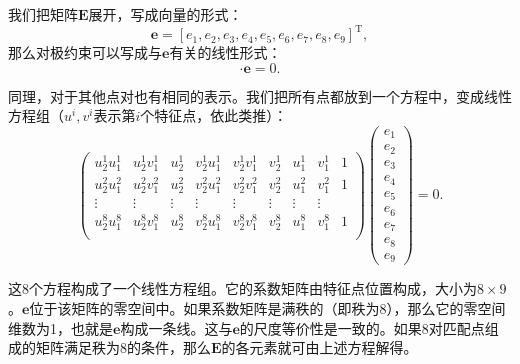 我们把矩阵$\bm{E}$展开，写成向量的形式：
\[
\bm{e}= [e_{1},e_{2},e_{3},e_{4},e_{5},e_{6},e_{7},e_{8},e_{9}]^{\mathrm{T}},
\]
那么对极约束可以写成与$\bm{e}$有关的线性形式：
\begin{equation}
[u_{2}u_{1},u_{2}v_{1},u_{2},v_{2}u_{1},v_{2}v_{1},v_{2},u_{1},v_{1},1] \cdot  \bm{e}=0.
\end{equation}

同理，对于其他点对也有相同的表示。我们把所有点都放到一个方程中，变成线性方程组（$u^i, v^i$表示第$i$个特征点，依此类推）：
\begin{equation}
\label{Eq:eight-point}
\begin{pmatrix}
u_{2}^{1}u_{1}^{1}& u_{2}^{1}v_{1}^{1}& u_{2}^{1}& v_{2}^{1}u_{1}^{1}& v_{2}^{1}v_{1}^{1}& v_{2}^{1} &u_{1}^{1} &v_{1}^{1}&1\\
u_{2}^{2}u_{1}^{2}& u_{2}^{2}v_{1}^{2}& u_{2}^{2}& v_{2}^{2}u_{1}^{2}& v_{2}^{2}v_{1}^{2}& v_{2}^{2} &u_{1}^{2} &v_{1}^{2}&1\\
\vdots & \vdots & \vdots & \vdots & \vdots & \vdots & \vdots & \vdots \\
u_{2}^{8}u_{1}^{8}& u_{2}^{8}v_{1}^{8}& u_{2}^{8}& v_{2}^{8}u_{1}^{8}& v_{2}^{8}v_{1}^{8}& v_{2}^{8} &u_{1}^{8}&v_{1}^{8}&1\\
\end{pmatrix}
\begin{pmatrix}
e_{1}\\ e_{2}\\ e_{3}\\  e_{4}\\ e_{5}\\ e_{6}\\ e_{7}\\ e_{8}\\ e_{9}  
\end{pmatrix}
=0.
\end{equation}

这8个方程构成了一个线性方程组。它的系数矩阵由特征点位置构成，大小为$8 \times 9$。$\bm{e}$位于该矩阵的零空间中。如果系数矩阵是满秩的（即秩为8），那么它的零空间维数为1，也就是$\bm{e}$构成一条线。这与$\bm{e}$的尺度等价性是一致的。如果8对匹配点组成的矩阵满足秩为8的条件，那么$\bm{E}$的各元素就可由上述方程解得。

